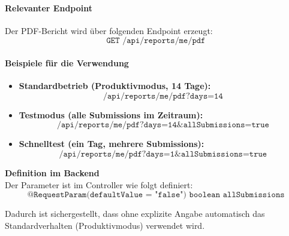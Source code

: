\paragraph{Relevanter Endpoint}
Der PDF-Bericht wird über folgenden Endpoint erzeugt:
\[
\texttt{GET /api/reports/me/pdf}
\]

\paragraph{Beispiele für die Verwendung}
\begin{itemize}
  \item \textbf{Standardbetrieb (Produktivmodus, 14 Tage):}
  \[
  \texttt{/api/reports/me/pdf?days=14}
  \]

  \item \textbf{Testmodus (alle Submissions im Zeitraum):}
  \[
  \texttt{/api/reports/me/pdf?days=14\&allSubmissions=true}
  \]

  \item \textbf{Schnelltest (ein Tag, mehrere Submissions):}
  \[
  \texttt{/api/reports/me/pdf?days=1\&allSubmissions=true}
  \]
\end{itemize}

\textbf{Definition im Backend}\\
Der Parameter ist im Controller wie folgt definiert:
\[
\texttt{@RequestParam(defaultValue = "false") boolean allSubmissions}
\]

Dadurch ist sichergestellt, dass ohne explizite Angabe automatisch das
Standardverhalten (Produktivmodus) verwendet wird.

